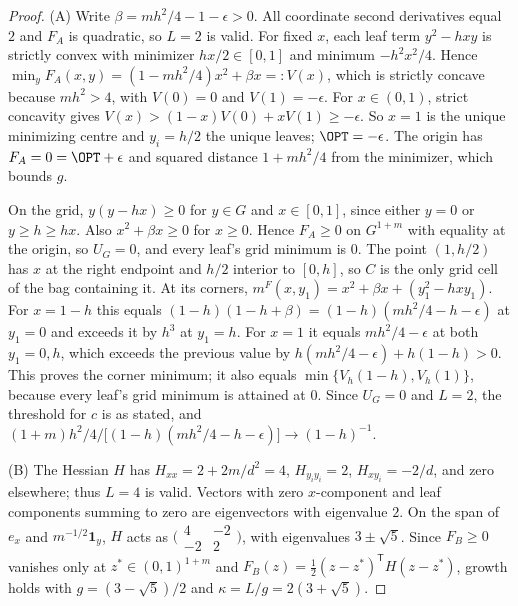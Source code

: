 \begin{proof}
(A) Write $\beta=mh^2/4-1-\epsilon>0$. All coordinate second derivatives
equal $2$ and $F_A$ is quadratic, so $L=2$ is valid. For fixed $x$, each
leaf term $y^2-hxy$ is strictly convex with minimizer $hx/2\in[0,1]$ and
minimum $-h^2x^2/4$. Hence $\min_yF_A(x,y)=(1-mh^2/4)x^2+\beta x=:V(x)$,
which is strictly concave because $mh^2>4$, with $V(0)=0$ and
$V(1)=-\epsilon$. For $x\in(0,1)$, strict concavity gives
$V(x)>(1-x)V(0)+xV(1)\ge-\epsilon$. So $x=1$ is the unique minimizing
centre and $y_i=h/2$ the unique leaves; $\OPT=-\epsilon$. The origin has
$F_A=0=\OPT+\epsilon$ and squared distance $1+mh^2/4$ from the minimizer,
which bounds $g$.

On the grid, $y(y-hx)\ge0$ for $y\in G$ and $x\in[0,1]$, since either
$y=0$ or $y\ge h\ge hx$. Also $x^2+\beta x\ge0$ for $x\ge0$. Hence
$F_A\ge0$ on $G^{1+m}$ with equality at the origin, so $U_G=0$, and every
leaf's grid minimum is $0$. The point $(1,h/2)$ has $x$ at the right
endpoint and $h/2$ interior to $[0,h]$, so $C$ is the only grid cell of
the bag containing it. At its corners,
$m^F(x,y_1)=x^2+\beta x+(y_1^2-hxy_1)$. For $x=1-h$ this equals
$(1-h)(1-h+\beta)=(1-h)(mh^2/4-h-\epsilon)$ at $y_1=0$ and exceeds it by
$h^3$ at $y_1=h$. For $x=1$ it equals $mh^2/4-\epsilon$ at both $y_1=0,h$,
which exceeds the previous value by $h(mh^2/4-\epsilon)+h(1-h)>0$. This
proves the corner minimum; it also equals $\min\{V_h(1-h),V_h(1)\}$,
because every leaf's grid minimum is attained at $0$. Since $U_G=0$ and
$L=2$, the threshold for $c$ is as stated, and
$(1+m)h^2/4\big/\bigl[(1-h)(mh^2/4-h-\epsilon)\bigr]\to(1-h)^{-1}$.

(B) The Hessian $H$ has $H_{xx}=2+2m/d^2=4$, $H_{y_iy_i}=2$,
$H_{xy_i}=-2/d$, and zero elsewhere; thus $L=4$ is valid. Vectors with
zero $x$-component and leaf components summing to zero are eigenvectors
with eigenvalue $2$. On the span of $e_x$ and $m^{-1/2}\mathbf 1_y$, $H$
acts as $\bigl(\begin{smallmatrix}4&-2\\-2&2\end{smallmatrix}\bigr)$, with
eigenvalues $3\pm\sqrt5$. Since $F_B\ge0$ vanishes only at $z^*\in(0,1)^{1+m}$
and $F_B(z)=\frac12(z-z^*)^{\mathsf T}H(z-z^*)$, growth holds with
$g=(3-\sqrt5)/2$ and $\kappa=L/g=2(3+\sqrt5)$.


\end{proof}
